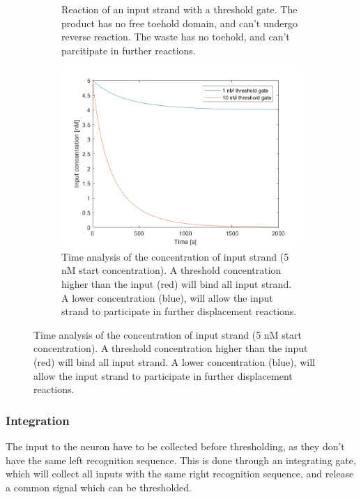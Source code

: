 \begin{figure}[H]
  \begin{subfigure}[t]{.49\columnwidth}
    \centering
{} {

}
\caption{Reaction of an input strand with a threshold gate. The product has no free toehold domain, and can't undergo reverse reaction. The waste has no toehold, and can't parcitipate in further reactions.}
\label{}
\end{subfigure}
\hfill
\begin{subfigure}[t]{.49\columnwidth}
  \centering
\includegraphics[width=\linewidth]{images/thresholding.png}
\caption{Time analysis of the concentration of input strand (5 nM start concentration). A threshold concentration higher than the input (red) will bind all input strand. A lower concentration (blue), will allow the input strand to participate in further displacement reactions.}
\label{}
\end{subfigure}
\end{figure}

\subsubsection{Integration}
The input to the neuron have to be collected before thresholding, as they don't have the same left recognition sequence. This is done through an integrating gate, which will collect all inputs with the same right recognition sequence, and release a common signal which can be thresholded.

